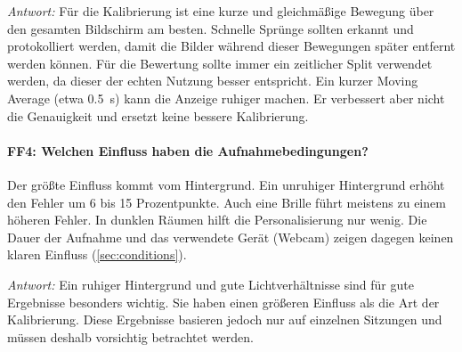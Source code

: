 \emph{Antwort:} Für die Kalibrierung ist eine kurze und gleichmäßige Bewegung
über den gesamten Bildschirm am besten. Schnelle Sprünge sollten erkannt und
protokolliert werden, damit die Bilder während dieser Bewegungen später
entfernt werden können. Für die Bewertung sollte immer ein zeitlicher Split
verwendet werden, da dieser der echten Nutzung besser entspricht. Ein kurzer
Moving Average (etwa \SI{0,5}{\second}) kann die Anzeige ruhiger machen. Er
verbessert aber nicht die Genauigkeit und ersetzt keine bessere Kalibrierung.

\paragraph{FF4: Welchen Einfluss haben die Aufnahmebedingungen?}
Der größte Einfluss kommt vom Hintergrund. Ein unruhiger Hintergrund erhöht den
Fehler um 6 bis 15 Prozentpunkte. Auch eine Brille führt meistens zu einem
höheren Fehler. In dunklen Räumen hilft die Personalisierung nur wenig. Die
Dauer der Aufnahme und das verwendete Gerät (Webcam) zeigen dagegen keinen
klaren Einfluss (\cref{sec:conditions}).

\emph{Antwort:} Ein ruhiger Hintergrund und gute Lichtverhältnisse sind für gute
Ergebnisse besonders wichtig. Sie haben einen größeren Einfluss als die Art der
Kalibrierung. Diese Ergebnisse basieren jedoch nur auf einzelnen Sitzungen und
müssen deshalb vorsichtig betrachtet werden.

